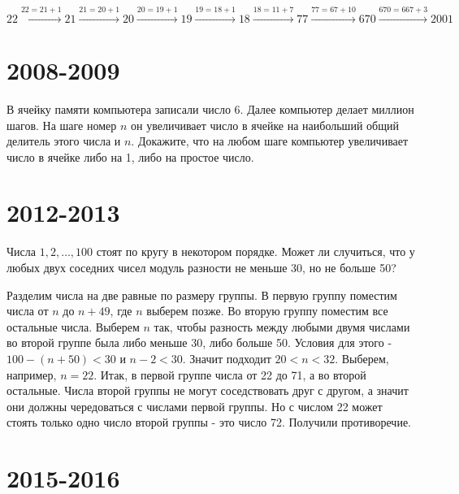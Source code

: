 \documentclass[11pt, a4paper]{template}
\begin{document}
\begin{solution}
$$
22 \xrightarrow{22 = 21 + 1} 21 \xrightarrow{21 = 20 + 1} 20 \xrightarrow{20 = 19 + 1} 19 \xrightarrow{19 = 18+1} 18 \xrightarrow {18 = 11 + 7} 77 \xrightarrow{77 = 67 + 10} 670 \xrightarrow{670=667+3} 2001
$$
\end{solution}

\chapter{2008-2009}

\begin{exercise}
В ячейку памяти компьютера записали число 6. Далее компьютер делает миллион шагов. На шаге номер $n$ он увеличивает число в ячейке на наибольший общий делитель этого числа и $n$. Докажите, что на любом шаге компьютер увеличивает число в ячейке либо на 1, либо на простое число.
\end{exercise}

\begin{solution}

\end{solution}

\chapter{2012-2013}

\begin{exercise}
Числа $1, 2, \dots, 100$ стоят по кругу в некотором порядке. Может ли случиться, что у любых двух соседних чисел модуль разности не меньше 30, но не больше 50?
\end{exercise}

\begin{solution}
Разделим числа на две равные по размеру группы. В первую группу поместим числа от $n$ до $n + 49$, где $n$ выберем позже. Во вторую группу поместим все остальные числа. Выберем $n$ так, чтобы разность между любыми двумя числами во второй группе была либо меньше 30, либо больше 50. Условия для этого - $100 - (n + 50) < 30$ и $n - 2 < 30$. Значит подходит $20 < n < 32$. Выберем, например, $n = 22$. Итак, в первой группе числа от 22 до 71, а во второй остальные. Числа второй группы не могут соседствовать друг с другом, а значит они должны чередоваться с числами первой группы. Но с числом 22 может стоять только одно число второй группы - это число 72. Получили противоречие.
\end{solution}

\chapter{2015-2016}
\end{document}
